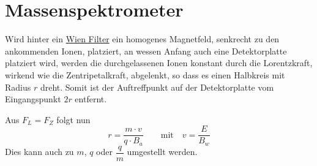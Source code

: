 \documentclass{article}
\begin{document}
\section{Massenspektrometer} 
Wird hinter ein \hyperref[Wien Filter]{Wien Filter} ein homogenes Magnetfeld, senkrecht zu den ankommenden Ionen, platziert, an wessen Anfang auch eine Detektorplatte platziert wird, werden die durchgelassenen Ionen konstant durch die Lorentzkraft, wirkend wie die Zentripetalkraft, abgelenkt, so dass es einen Halbkreis mit Radius $r$ dreht. Somit ist der Auftreffpunkt auf der Detektorplatte vom Eingangspunkt $2r$ entfernt.
 
Aus $F_L = F_Z$ folgt nun
\[
 r = \frac{m \cdot v}{q \cdot B_a}
 \qquad \text{mit} \quad
 v = \frac{E}{B_w} 
\]
Dies kann auch zu $m$, $q$ oder $\dfrac{q}{m}$ umgestellt werden. 
\end{document}
